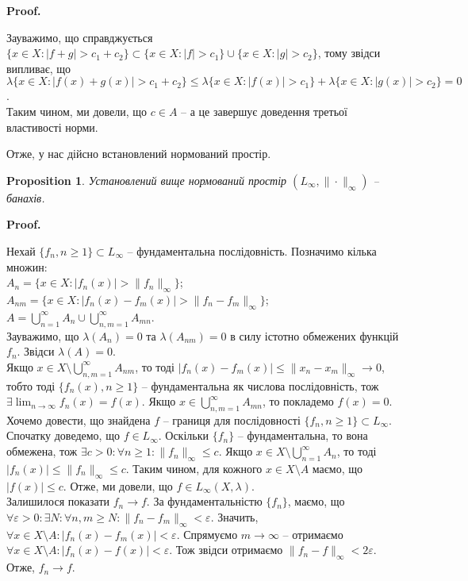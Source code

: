 \documentclass[a4paper, 10pt]{article}
\makeatletter
\theoremstyle{theoremdd}
\newtheorem{proposition}[theorem]{Proposition}
\renewenvironment{proof}[1][Proof.\\]{\par
\pushQED{\hfill \qed}%
\normalfont \topsep6\p@\@plus6\p@\relax
\trivlist
\item\relax
{\bfseries
#1\@addpunct{.}}\hspace\labelsep\ignorespaces
}{%
\popQED\endtrivlist\@endpefalse
}
\makeatother
\begin{document}
\begin{proof}
\begin{enumerate}[nosep,wide=0pt,label={\arabic*)}]
Зауважимо, що справджується $\{x \in X: |f+g| > c_1+c_2\} \subset \{x \in X: |f| > c_1\} \cup \{x \in X: |g| > c_2\}$, тому звідси випливає, що \\ $\lambda\{x \in X: |f(x)+g(x)| > c_1+c_2\} \leq \lambda\{x \in X: |f(x)| > c_1\} + \lambda\{x \in X: |g(x)| > c_2\} = 0$.\\
Таким чином, ми довели, що $c \in A$ -- а це завершує доведення третьої властивості норми.
\end{enumerate}
Отже, у нас дійсно встановлений нормований простір.
\end{proof}

\begin{proposition}
Установлений вище нормований простір $(L_\infty, \| \cdot \|_\infty)$ -- банахів.
\end{proposition}

\begin{proof}
Нехай $\{f_n, n \geq 1\} \subset L_\infty$ -- фундаментальна послідовність. Позначимо кілька множин:\\
$A_n = \{x \in X: |f_n(x)| > \|f_n\|_\infty\}$;\\
$A_{nm} = \{x \in X: |f_n(x) - f_m(x)| > \|f_n-f_m\|_\infty\}$;\\
$A = \displaystyle\bigcup_{n=1}^\infty A_n \cup \bigcup_{n,m=1}^\infty A_{mn}$.\\
Зауважимо, що $\lambda(A_n) = 0$ та $\lambda(A_{nm}) = 0$ в силу істотно обмежених функцій $f_n$. Звідси $\lambda(A) = 0$.\\
Якщо $x \in X \setminus \displaystyle\bigcup_{n,m=1}^\infty A_{nm}$, то тоді $|f_n(x) - f_m(x)| \leq \|x_n - x_m\|_\infty \to 0$, тобто тоді $\{f_n(x),n \geq 1\}$ -- фундаментальна як числова послідовність, тож $\exists \displaystyle\lim_{n \to \infty} f_n(x) = f(x)$. Якщо $x \in \displaystyle\bigcup_{n,m=1}^\infty A_{mn}$, то покладемо $f(x) = 0$.\\
Хочемо довести, що знайдена $f$ -- границя для послідовності $\{f_n, n \geq 1\} \subset L_\infty$.\\
Спочатку доведемо, що $f \in L_\infty$. Оскільки $\{f_n\}$ -- фундаментальна, то вона обмежена, тож $\exists c > 0: \forall n \geq 1: \|f_n\|_\infty \leq c$. Якщо $x \in X \setminus \displaystyle\bigcup_{n=1}^\infty A_n$, то тоді $|f_n(x)| \leq \|f_n\|_\infty \leq c$. Таким чином, для кожного $x \in X \setminus A$ маємо, що $|f(x)| \leq c$. Отже, ми довели, що $f \in L_{\infty}(X,\lambda)$.\\
Залишилося показати $f_n \to f$. За фундаментальністю $\{f_n\}$, маємо, що $\forall \varepsilon > 0: \exists N: \forall n,m \geq N: \| f_n - f_m \|_\infty < \varepsilon$. Значить, $\forall x \in X \setminus A: |f_n(x) - f_m(x)| < \varepsilon$. Спрямуємо $m \to \infty$ -- отримаємо $\forall x \in X \setminus A: |f_n(x) - f(x)| < \varepsilon$. Тож звідси отримаємо $\|f_n-f\|_{\infty} < 2 \varepsilon$. Отже, $f_n \to f$.
\end{proof}
\end{document}
